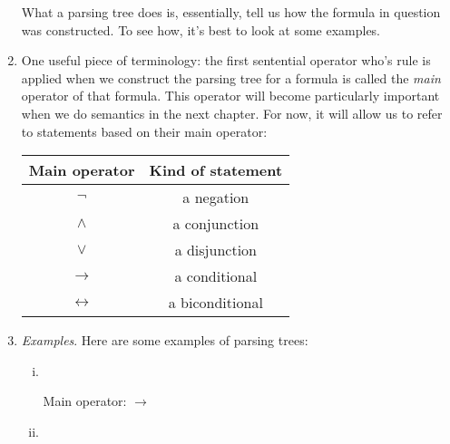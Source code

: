 \begin{enumerate}[\thesection.1]
	What a parsing tree does is, essentially, tell us how the formula in question was constructed. To see how, it's best to look at some examples.
	
	\item One useful piece of terminology: the first sentential operator who's rule is applied when we construct the parsing tree for a formula is called the \emph{main} operator of that formula. This operator will become particularly important when we do semantics in the next chapter. For now, it will allow us to refer to statements based on their main operator:
		\begin{center}
			\begin{tabular}{c | c}
			Main operator & Kind of statement\\\hline
			$\neg$ & a negation\\
			$\land$ & a conjunction\\
			$\lor$ & a disjunction\\
			$\to$ & a conditional\\
			$\leftrightarrow$ & a biconditional
			\end{tabular}
		\end{center}
	
	\item \emph{Examples}. Here are some examples of parsing trees:
			
		\begin{enumerate}[(i)]
		
		\item \
			\begin{center}

Main operator: $\to$
\end{center}

		\item \
		
		\begin{center}


\end{center}
\end{enumerate}
\end{enumerate}
